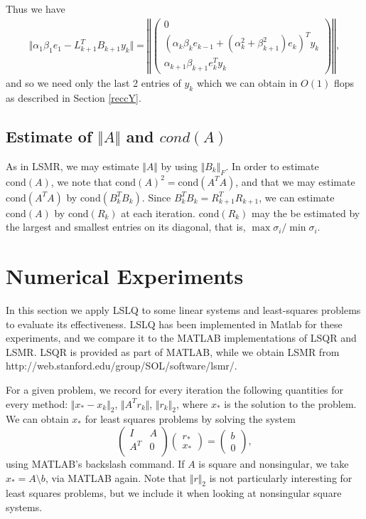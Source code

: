 \documentclass[11pt]{article}
\begin{document}
Thus we have
\begin{eqnarray*}
\Vert \alpha_1 \beta_1 e_1 - L^T_{k+1} B_{k+1} y_k \Vert = \left\Vert \begin{pmatrix}
0 \\ (\alpha_k \beta_k e_{k-1} + (\alpha^2_k + \beta^2_{k+1}) e_k)^T y_k \\ \alpha_{k+1} \beta_{k+1} e^T_{k} y_k
\end{pmatrix} \right\Vert,
\end{eqnarray*}
and so we need only the last 2 entries of $y_k$ which we can obtain in $O(1)$ flops as described in Section \ref{reccY}.

\subsection{Estimate of $\Vert A \Vert$ and $cond(A)$}
As in LSMR, we may estimate $\Vert A \Vert$ by using $\Vert B_k \Vert_F$. In order to estimate $\text{cond} (A)$, we note that $\text{cond}(A)^2 = \text{cond}(A^T A)$, and that we may estimate $\text{cond}(A^T A)$ by $\text{cond}(B_k^T B_k)$. Since $B_k^T B_k = R_{k+1}^T R_{k+1}$, we can estimate $\text{cond}(A)$ by $\text{cond}(R_k)$ at each iteration. $\text{cond}(R_k)$ may the be estimated by the largest and smallest entries on its diagonal, that is, $\max \sigma_i / \min \sigma_i$.

\section{Numerical Experiments}
In this section we apply LSLQ to some linear systems and least-squares problems to evaluate its effectiveness. LSLQ has been implemented in Matlab for these experiments, and we compare it to the MATLAB implementations of LSQR and LSMR. LSQR is provided as part of MATLAB, while we obtain LSMR from http://web.stanford.edu/group/SOL/software/lsmr/.

For a given problem, we record for every iteration the following quantities for every method: $\Vert x_* - x_k \Vert_2$, $\Vert A^T r_k \Vert$, $\Vert r_k \Vert_2$, where $x_*$ is the solution to the problem. We can obtain $x_*$ for least squares problems by solving the system
$$ \begin{pmatrix}
I & A \\
A^T & 0 \\
\end{pmatrix} \begin{pmatrix}
r_* \\ x_*
\end{pmatrix} = \begin{pmatrix}
b \\ 0
\end{pmatrix}, $$
using MATLAB's backslash command. If $A$ is square and nonsingular, we take $x_* = A \setminus b$, via MATLAB again. Note that $\Vert r \Vert_2$ is not particularly interesting for least squares problems, but we include it when looking at nonsingular square systems.
\end{document}
